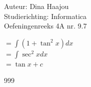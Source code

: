 \documentclass[a4paper]{article}
\begin{document}
\noindent \large Auteur: Dina Haajou \\
\noindent \large Studierichting: Informatica \\
\noindent \large Oefeningenreeks 4A nr. 9.7 \\

\medskip

\normalsize

$= \displaystyle\int (1 + \tan^2 x) dx$ \\

$= \displaystyle\int \sec^2 x dx$ \\

$= \tan x + c$

\begin{thebibliography}{999}
\end{thebibliography}
\end{document}
